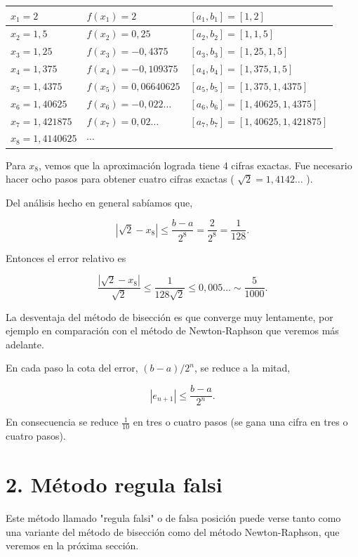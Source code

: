 \documentclass[10pt]{article}
\begin{document}
\begin{center}
\begin{tabular}{|l|l|l|}
\hline
$x_{1}=2$ & $f\left(x_{1}\right)=2$ & $\left[a_{1}, b_{1}\right]=[1,2]$ \\
\hline
$x_{2}=1,5$ & $f\left(x_{2}\right)=0,25$ & $\left[a_{2}, b_{2}\right]=[1,1,5]$ \\
\hline
$x_{3}=1,25$ & $f\left(x_{3}\right)=-0,4375$ & $\left[a_{3}, b_{3}\right]=[1,25,1,5]$ \\
\hline
$x_{4}=1,375$ & $f\left(x_{4}\right)=-0,109375$ & $\left[a_{4}, b_{4}\right]=[1,375,1,5]$ \\
\hline
$x_{5}=1,4375$ & $f\left(x_{5}\right)=0,06640625$ & $\left[a_{5}, b_{5}\right]=[1,375,1,4375]$ \\
\hline
$x_{6}=1,40625$ & $f\left(x_{6}\right)=-0,022 \ldots$ & $\left[a_{6}, b_{6}\right]=[1,40625,1,4375]$ \\
\hline
$x_{7}=1,421875$ & $f\left(x_{7}\right)=0,02 \ldots$ & $\left[a_{7}, b_{7}\right]=[1,40625,1,421875]$ \\
\hline
$x_{8}=1,4140625$ & $\cdots$ &  \\
\hline
\end{tabular}
\end{center}

Para $x_{8}$, vemos que la aproximación lograda tiene 4 cifras exactas. Fue necesario hacer ocho pasos para obtener cuatro cifras exactas ( $\sqrt{2}=1,4142 \ldots$ ).

Del análisis hecho en general sabíamos que,

$$
\left|\sqrt{2}-x_{8}\right| \leq \frac{b-a}{2^{8}}=\frac{2}{2^{8}}=\frac{1}{128} .
$$

Entonces el error relativo es

$$
\frac{\left|\sqrt{2}-x_{8}\right|}{\sqrt{2}} \leq \frac{1}{128 \sqrt{2}} \leq 0,005 \ldots \sim \frac{5}{1000} .
$$

La desventaja del método de bisección es que converge muy lentamente, por ejemplo en comparación con el método de Newton-Raphson que veremos más adelante.

En cada paso la cota del error, $(b-a) / 2^{n}$, se reduce a la mitad,

$$
\left|e_{n+1}\right| \leq \frac{b-a}{2^{n}} .
$$

En consecuencia se reduce $\frac{1}{10}$ en tres o cuatro pasos (se gana una cifra en tres o cuatro pasos).

\section*{2. Método regula falsi}
Este método llamado "regula falsi" o de falsa posición puede verse tanto como una variante del método de bisección como del método Newton-Raphson, que veremos en la próxima sección.
\end{document}
